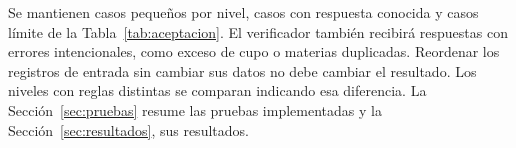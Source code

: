 Se mantienen casos pequeños por nivel, casos con respuesta conocida y casos límite de la Tabla~\ref{tab:aceptacion}. El verificador también recibirá respuestas con errores intencionales, como exceso de cupo o materias duplicadas. Reordenar los registros de entrada sin cambiar sus datos no debe cambiar el resultado. Los niveles con reglas distintas se comparan indicando esa diferencia. La Sección~\ref{sec:pruebas} resume las pruebas implementadas y la Sección~\ref{sec:resultados}, sus resultados.
